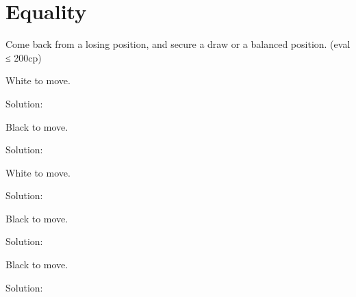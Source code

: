 \documentclass{book}
\begin{document}
\section{Equality}
Come back from a losing position, and secure a draw or a balanced position. (eval ≤ 200cp)\begin{multicols}{2} 
\begin{samepage} 
\newgame 


 
\showboard
 
 White to move. 
 
Solution: 
 
\end{samepage}\begin{samepage} 
\newgame 


 
\showboard
 
 Black to move. 
 
Solution: 
 
\end{samepage}\begin{samepage} 
\newgame 


 
\showboard
 
 White to move. 
 
Solution: 
 
\end{samepage}\begin{samepage} 
\newgame 


 
\showboard
 
 Black to move. 
 
Solution: 
 
\end{samepage}\begin{samepage} 
\newgame 


 
\showboard
 
 Black to move. 
 
Solution: 
 
\end{samepage}\begin{samepage} 
\newgame 


\end{samepage}
\end{multicols}
\end{document}
